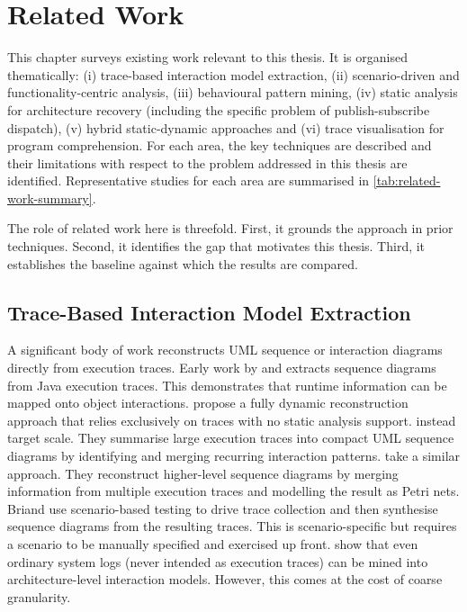 \chapter{Related Work}\label{ch:related}

This chapter surveys existing work relevant to this thesis. It is organised thematically:
(i) trace-based interaction model extraction, (ii) scenario-driven and
functionality-centric analysis, (iii) behavioural pattern mining, (iv) static
analysis for architecture recovery (including the specific problem of
publish-subscribe dispatch), (v) hybrid static-dynamic approaches and (vi) trace
visualisation for program comprehension.
For each area, the key techniques are described and their limitations with
respect to the problem addressed in this thesis are identified.
Representative studies for each area are summarised in \cref{tab:related-work-summary}.

The role of related work here is threefold. First, it grounds the approach in prior
techniques. Second, it identifies the gap that motivates this thesis. Third, it
establishes the baseline against which the results are compared.

\section{Trace-Based Interaction Model Extraction}

A significant body of work reconstructs \ac{UML} sequence or interaction
diagrams directly from execution traces.
Early work by \textcite{taniguchi:seqtrace} and \textcite{grati:interactive}
extracts sequence diagrams from Java execution traces. This demonstrates that
runtime information can be mapped onto object interactions.
\textcite{ziadi:dynamic} propose a fully dynamic reconstruction approach that
relies exclusively on traces with no static analysis support.
\textcite{hamou-lhadj:tracesummary} instead target scale. They summarise large
execution traces into compact \ac{UML} sequence diagrams by identifying and
merging recurring interaction patterns.
\textcite{baidada:petrinet} take a similar approach. They reconstruct higher-level
sequence diagrams by merging information from multiple execution traces and
modelling the result as Petri nets.
Briand \etal \cite{briand:seqdiag} use scenario-based testing to drive trace
collection and then synthesise sequence diagrams from the resulting traces.
This is scenario-specific but requires a scenario to be manually specified and
exercised up front.
\textcite{shang:loganalysis} show that even ordinary system logs (never
intended as execution traces) can be mined into architecture-level interaction
models. However, this comes at the cost of coarse granularity.

